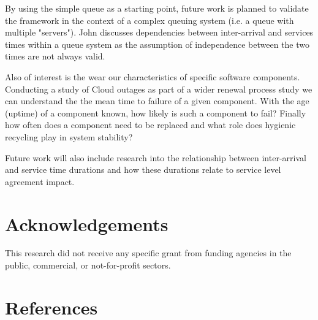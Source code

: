 \documentclass[5p]{elsarticle}
\begin{document}
By using the simple queue as a starting point, future work is planned to validate the framework in the context of a complex queuing system (i.e. a queue with multiple "servers"). John \cite{john1963single} discusses dependencies between inter-arrival and services times within a queue system as the assumption of independence between the two times are not always valid.

Also of interest is the wear our characteristics of specific software components. Conducting a study of Cloud outages as part of a wider renewal process study we can understand the the mean time to failure of a given component.  With the age (uptime) of a component known, how likely is such a component to fail? Finally how often does a component need to be replaced and what role does hygienic recycling play in system stability?

Future work will also include research into the relationship between inter-arrival and service time durations and how these durations relate to service level agreement impact.

\section{Acknowledgements}

This research did not receive any specific grant from funding agencies in the public, commercial, or not-for-profit sectors.

\section*{References}


\end{document}
